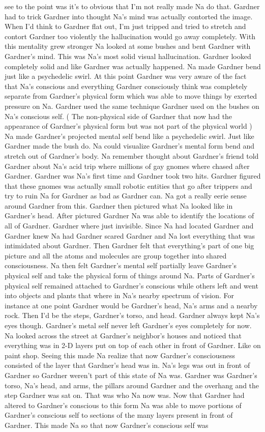 \documentclass[12pt]{book}
\begin{document}
see to the point was it's to obvious that I'm not really made Na do that. Gardner had to trick Gardner into thought Na's mind was actually contorted the image. When I'd think to Gardner flat out, I'm just tripped and tried to stretch and contort Gardner too violently the hallucination would go away completely. With this mentality grew stronger Na looked at some bushes and bent Gardner with Gardner's mind. This was Na's most solid visual hallucination. Gardner looked completely solid and like Gardner was actually happened. Na made Gardner bend just like a psychedelic swirl. At this point Gardner was very aware of the fact that Na's conscious and everything Gardner consciously think was completely separate from Gardner's physical form which was able to move things by exerted pressure on Na. Gardner used the same technique Gardner used on the bushes on Na's conscious self. ( The non-physical side of Gardner that now had the appearance of Gardner's physical form but was not part of the physical world ) Na made Gardner's projected mental self bend like a psychedelic swirl. Just like Gardner made the bush do. Na could visualize Gardner's mental form bend and stretch out of Gardner's body. Na remember thought about Gardner's friend told Gardner about Na's acid trip where millions of gay gnomes where chased after Gardner. Gardner was Na's first time and Gardner took two hits. Gardner figured that these gnomes was actually small robotic entities that go after trippers and try to ruin Na for Gardner as bad as Gardner can. Na got a really eerie sense around Gardner from this. Gardner then pictured what Na looked like in Gardner's head. After pictured Gardner Na was able to identify the locations of all of Gardner. Gardner where just invisible. Since Na had located Gardner and Gardner knew Na had Gardner scared Gardner and Na lost everything that was intimidated about Gardner. Then Gardner felt that everything's part of one big picture and all the atoms and molecules are group together into shared consciousness. Na then felt Gardner's mental self partially leave Gardner's physical self and take the physical form of things around Na. Parts of Gardner's physical self remained attached to Gardner's conscious while others left and went into objects and plants that where in Na's nearby spectrum of vision. For instance at one point Gardner would be Gardner's head, Na's arms and a nearby rock. Then I'd be the steps, Gardner's torso, and head. Gardner always kept Na's eyes though. Gardner's metal self never left Gardner's eyes completely for now. Na looked across the street at Gardner's neighbor's houses and noticed that everything was in 2-D layers put on top of each other in front of Gardner. Like on paint shop. Seeing this made Na realize that now Gardner's consciousness consisted of the layer that Gardner's head was in. Na's legs was out in front of Gardner so Gardner weren't part of this state of Na was. Gardner was Gardner's torso, Na's head, and arms, the pillars around Gardner and the overhang and the step Gardner was sat on. That was who Na now was. Now that Gardner had altered to Gardner's conscious to this form Na was able to move portions of Gardner's conscious self to sections of the many layers present in front of Gardner. This made Na so that now Gardner's conscious self was 
\end{document}
